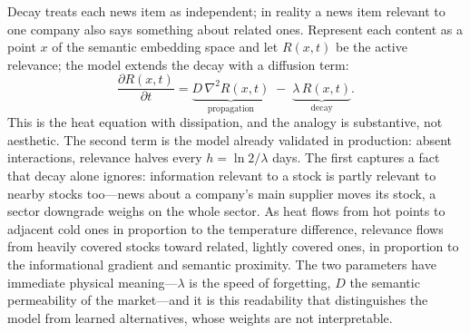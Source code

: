 \documentclass[a4paper,11pt]{article}
\begin{document}
Decay treats each news item as independent; in reality a news item relevant to one company also says something about related ones. Represent each content as a point $x$ of the semantic embedding space and let $R(x,t)$ be the active relevance; the model extends the decay with a diffusion term:
\[
\frac{\partial R(x,t)}{\partial t} = \underbrace{D\,\nabla^2 R(x,t)}_{\text{propagation}} \;-\; \underbrace{\lambda\, R(x,t)}_{\text{decay}}.
\]
This is the heat equation with dissipation, and the analogy is substantive, not aesthetic. The second term is the model already validated in production: absent interactions, relevance halves every $h=\ln 2/\lambda$ days. The first captures a fact that decay alone ignores: information relevant to a stock is partly relevant to nearby stocks too---news about a company's main supplier moves its stock, a sector downgrade weighs on the whole sector. As heat flows from hot points to adjacent cold ones in proportion to the temperature difference, relevance flows from heavily covered stocks toward related, lightly covered ones, in proportion to the informational gradient and semantic proximity. The two parameters have immediate physical meaning---$\lambda$ is the speed of forgetting, $D$ the semantic permeability of the market---and it is this readability that distinguishes the model from learned alternatives, whose weights are not interpretable.
\end{document}
